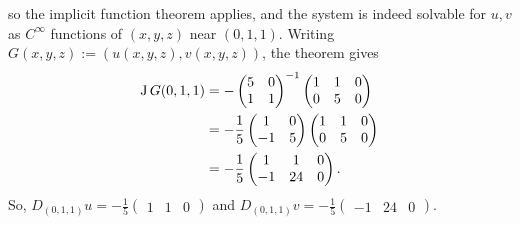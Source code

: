 \begin{exercisesolution}
so the implicit function theorem applies, and the system is indeed solvable for $u,v$ as
$C^\infty$ functions of $(x,y,z)$ near $(0,1,1)$. Writing $G(x,y,z) := (u(x,y,z),v(x,y,z))$, the
theorem gives
\begin{align*}
\operatorname{J} G(0,1,1)
  &= -\begin{pmatrix}5&0\\1&1\end{pmatrix}^{-1}\begin{pmatrix}1&1&0\\0&5&0\end{pmatrix} \\
  &= -\frac15\begin{pmatrix}1&0\\-1&5\end{pmatrix}\begin{pmatrix}1&1&0\\0&5&0\end{pmatrix} \\
  &= -\frac15\begin{pmatrix}1&1&0\\-1&24&0\end{pmatrix}.
\end{align*}
So, $D_{(0,1,1)}u = -\tfrac15\left(\begin{smallmatrix}1&1&0\end{smallmatrix}\right)$ and
$D_{(0,1,1)}v = -\tfrac15\left(\begin{smallmatrix}-1&24&0\end{smallmatrix}\right)$.
\end{exercisesolution}

